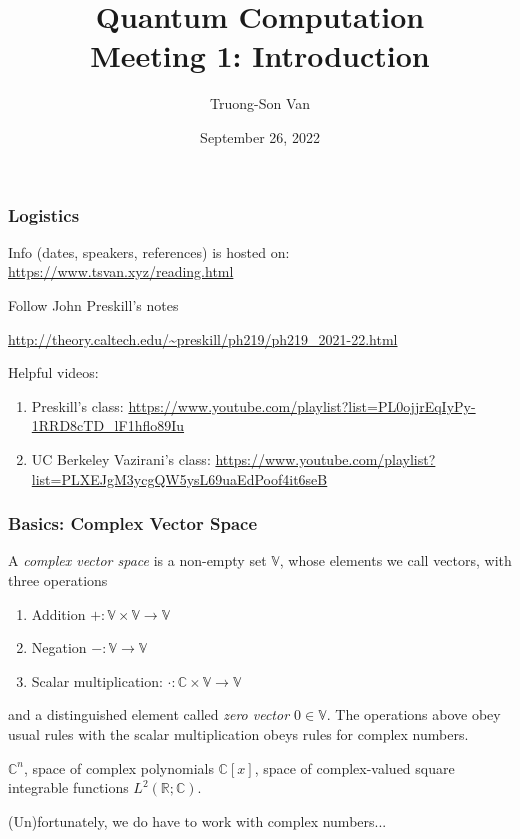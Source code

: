 \documentclass[12pt]{beamer}
\title{ Quantum Computation \\ Meeting 1: Introduction }
\author{Truong-Son Van}
\institute{Fulbright University Vietnam Reading Group}
\date{September 26, 2022}
\begin{document}
\frame{\titlepage}

\begin{frame}
    \frametitle{Logistics}
    Info (dates, speakers, references) is hosted on: \url{https://www.tsvan.xyz/reading.html}
    
    Follow John Preskill's notes 

    \url{http://theory.caltech.edu/~preskill/ph219/ph219_2021-22.html}

    Helpful videos:
    \begin{enumerate}
        \item Preskill's class: \url{https://www.youtube.com/playlist?list=PL0ojjrEqIyPy-1RRD8cTD_lF1hflo89Iu}
        \item UC Berkeley Vazirani's class: \url{https://www.youtube.com/playlist?list=PLXEJgM3ycgQW5ysL69uaEdPoof4it6seB}
    \end{enumerate}
\end{frame}

\begin{frame}
    \frametitle{ Basics: Complex Vector Space}
    A \emph{complex vector space} is a non-empty set $\mathbb{V}$, whose elements we call vectors, with three 
    operations
    \begin{enumerate}
        \item Addition $+: \mathbb{V} \times \mathbb{V} \to \mathbb{V}$
        \item Negation $-: \mathbb{V}\to \mathbb{V}$
        \item Scalar multiplication: $\cdot : \mathbb{C} \times \mathbb{V} \to \mathbb{V}$
    \end{enumerate}
    and a distinguished element called \emph{zero vector $0\in \mathbb{V}$}.
    The operations above obey usual rules with the scalar multiplication obeys rules for complex numbers.


    \begin{example}
        $\mathbb{C}^n$, space of complex polynomials $\mathbb{C}[x]$, 
        space of complex-valued square integrable functions $L^2(\mathbb{R};\mathbb{C})$.
    \end{example}

    (Un)fortunately, we do have to work with complex numbers...
\end{frame}
\end{document}
